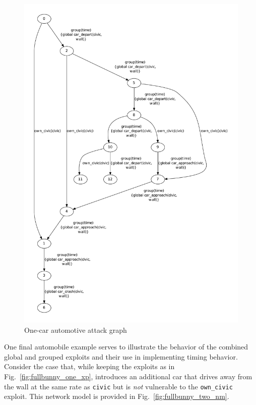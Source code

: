 \begin{figure}
\centering
\includegraphics[height=0.9\textheight]{ag_car/onecar/full_bunny_onecar_ag_5}
\caption{One-car automotive attack graph}
\label{fig:fullbunny_one_ag}
\end{figure}

One final automobile example serves to illustrate the behavior of the
combined global and grouped exploits and their use in implementing
timing behavior. Consider the case that, while keeping the exploits
as in Fig.~\ref{fig:fullbunny_one_xp}, introduces an additional car
that drives away from the wall
at the same rate as \texttt{civic} but is \emph{not} vulnerable to the 
\texttt{own_civic} exploit. This network model is provided in 
Fig.~\ref{fig:fullbunny_two_nm}.

